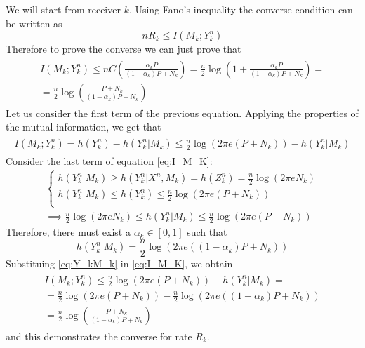 We will start from receiver $k$. Using Fano's inequality the converse condition can be written as
\begin{equation}
  nR_k\leq I(M_k;Y^n_k)
\end{equation}
Therefore to prove the converse we can just prove that
\begin{align}
  \begin{split}
    I(M_k;Y^n_k)\leq nC\left(\frac{\alpha_k P}{\left(1-\alpha_k\right)P + N_k}\right) = \frac{n}{2}\log\left(1+\frac{\alpha_k P}{\left(1-\alpha_k\right)P + N_k}\right)=\\
    =\frac{n}{2}\log\left(\frac{P+N_k}{\left(1-\alpha_k\right)P + N_k}\right)
  \end{split}
\end{align}
Let us consider the first term of the previous equation. Applying the properties of the mutual information, we get that
\begin{align}
  \begin{split}
    I(M_k;Y_k^n) = h(Y_k^n) - h(Y_k^n|M_k)
    \leq \frac{n}{2}\log(2\pi e (P+N_k))- h(Y_k^n|M_k)
    \label{eq:I_M_K}
  \end{split}
\end{align}
Consider the last term of equation \eqref{eq:I_M_K}:
\begin{align}
  \begin{cases}
  h(Y_k^n|M_k)\geq h(Y_k^n|X^n,M_k) = h(Z^n_k) = \frac{n}{2}\log\left(2\pi e N_k\right) \\
  h(Y_k^n|M_k)\leq h(Y_k^n)\leq \frac{n}{2} \log(2\pi e (P+N_k))\\
  \end{cases}
  \\
  \implies \frac{n}{2}\log\left(2\pi e N_k\right)\leq h(Y_k^n|M_k) \leq \frac{n}{2} \log(2\pi e (P+N_k))
\end{align}
Therefore, there must exist a $\alpha_k \in [0,1]$ such that
\begin{equation}
  h(Y_k^n|M_k) = \frac{n}{2}\log(2\pi e ((1-\alpha_k) P+N_k))
  \label{eq:Y_kM_k}
\end{equation}
Substituing \eqref{eq:Y_kM_k} in \eqref{eq:I_M_K}, we obtain
\begin{align}
  \begin{split}
    I(M_k;Y_k^n) \leq \frac{n}{2}\log(2\pi e (P+N_k))- h(Y_k^n|M_k) =\\ =\frac{n}{2}\log(2\pi e (P+N_k))-\frac{n}{2}\log(2\pi e ((1-\alpha_k) P+N_k))\\
    = \frac{n}{2}\log(\frac{P+N_k}{(1-\alpha_k)P+N_k})
  \end{split}
  \label{eq:I_M_K}
\end{align}
and this demonstrates the converse for rate $R_k$.\\

